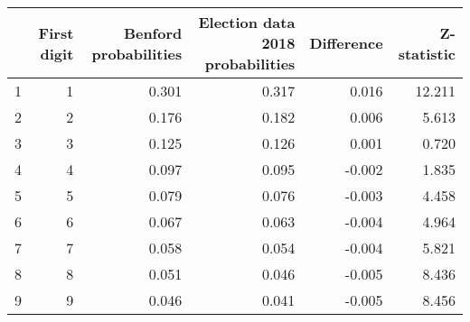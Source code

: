 \begin{tabular}{lrrrrr}
\toprule
 & First digit & Benford probabilities & Election data 2018 probabilities & Difference & Z-statistic \\
\midrule
1 & 1 & 0.301 & 0.317 & 0.016 & 12.211 \\
2 & 2 & 0.176 & 0.182 & 0.006 & 5.613 \\
3 & 3 & 0.125 & 0.126 & 0.001 & 0.720 \\
4 & 4 & 0.097 & 0.095 & -0.002 & 1.835 \\
5 & 5 & 0.079 & 0.076 & -0.003 & 4.458 \\
6 & 6 & 0.067 & 0.063 & -0.004 & 4.964 \\
7 & 7 & 0.058 & 0.054 & -0.004 & 5.821 \\
8 & 8 & 0.051 & 0.046 & -0.005 & 8.436 \\
9 & 9 & 0.046 & 0.041 & -0.005 & 8.456 \\
\bottomrule
\end{tabular}
